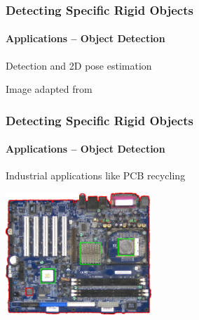 \documentclass[xetex,professionalfont]{beamer}
\begin{document}

\begin{frame}
\frametitle{Detecting Specific Rigid Objects}
\framesubtitle{Applications -- Object Detection}

Detection and 2D pose estimation

\bigskip
\begin{center}
    {\centering Image adapted from \cite{lowe2004}}
\end{center}

\end{frame}


\begin{frame}
\frametitle{Detecting Specific Rigid Objects}
\framesubtitle{Applications -- Object Detection}

Industrial applications like PCB recycling

\bigskip
\begin{center}
\includegraphics[width=5.5cm]{figures/reclaim-pcb.jpg}
\end{center}

\end{frame}

\end{document}
